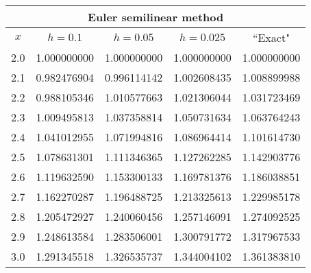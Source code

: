 \documentclass{ximera}
\begin{document}
\begin{problem}
\begin{solution}
{\small
\begin{tabular}{|c|r|r|r|r|}
\hline
\multicolumn{5}{|c|}{Euler semilinear method}\\\hline
\multicolumn{1}{|c|}{$x$}&
\multicolumn{1}{|c|}{$h=0.1$}&
\multicolumn{1}{|c|}{$h=0.05$}&
\multicolumn{1}{|c|}{$h=0.025$}&
\multicolumn{1}{|c|}{``Exact"}\\ \hline
2.0 & 1.000000000 & 1.000000000 & 1.000000000 & 1.000000000 \\
2.1 & 0.982476904 & 0.996114142 & 1.002608435 & 1.008899988 \\
2.2 & 0.988105346 & 1.010577663 & 1.021306044 & 1.031723469 \\
2.3 & 1.009495813 & 1.037358814 & 1.050731634 & 1.063764243 \\
2.4 & 1.041012955 & 1.071994816 & 1.086964414 & 1.101614730 \\
2.5 & 1.078631301 & 1.111346365 & 1.127262285 & 1.142903776 \\
2.6 & 1.119632590 & 1.153300133 & 1.169781376 & 1.186038851 \\
2.7 & 1.162270287 & 1.196488725 & 1.213325613 & 1.229985178 \\
2.8 & 1.205472927 & 1.240060456 & 1.257146091 & 1.274092525 \\
2.9 & 1.248613584 & 1.283506001 & 1.300791772 & 1.317967533 \\
3.0 & 1.291345518 & 1.326535737 & 1.344004102 & 1.361383810 \\
\hline
\end{tabular}}

 \end{solution}
 \end{problem}
\end{document}
